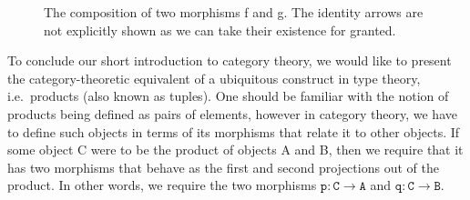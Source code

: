 \documentclass[12pt,twoside,maitrise]{dms}
\theoremstyle{definition}
\numberwithin{equation}{section}
\numberwithin{table}{chapter}
\numberwithin{figure}{chapter}
\newcommand\id[1] {\texttt{#1}}
\begin{document}
\begin{figure}[H]

\caption{The composition of two morphisms f and g. The identity arrows are not explicitly shown as we can take their existence for granted.}

\end{figure}

To conclude our short introduction to category theory, we would like to present the category-theoretic equivalent of a ubiquitous construct in type theory, i.e.\ products (also known as tuples). One should be familiar with the notion of products being defined as pairs of elements, however in category theory, we have to define such objects in terms of its morphisms that relate it to other objects. If some object C were to be the product of objects A and B, then we require that it has two morphisms that behave as the first and second projections out of the product. In other words, we require the two morphisms $\id{p} : \id{C} \rightarrow \id{A}$ and $\id{q} : \id{C} \rightarrow \id{B}$.
\end{document}
